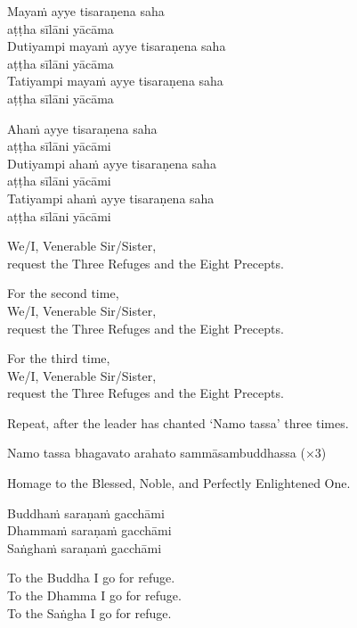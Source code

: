 
Mayaṁ ayye tisaraṇena saha\\\vin aṭṭha sīlāni yācāma\\
Dutiyampi mayaṁ ayye tisaraṇena saha\\\vin aṭṭha sīlāni yācāma\\
Tatiyampi mayaṁ ayye tisaraṇena saha\\\vin aṭṭha sīlāni yācāma


Ahaṁ ayye tisaraṇena saha\\\vin aṭṭha sīlāni yācāmi\\
Dutiyampi ahaṁ ayye tisaraṇena saha\\\vin aṭṭha sīlāni yācāmi\\
Tatiyampi ahaṁ ayye tisaraṇena saha\\\vin aṭṭha sīlāni yācāmi

\begin{english}
  We/I, Venerable Sir/Sister,\\
  request the Three Refuges and the Eight Precepts.

  For the second time,\\
  We/I, Venerable Sir/Sister,\\
  request the Three Refuges and the Eight Precepts.

  For the third time,\\
  We/I, Venerable Sir/Sister,\\
  request the Three Refuges and the Eight Precepts.
\end{english}

\begin{instruction}
  Repeat, after the leader has chanted ‘Namo tassa’ three times.
\end{instruction}

Namo tassa bhagavato arahato sammāsambuddhassa (×3)

\begin{english}
  Homage to the Blessed, Noble, and Perfectly Enlightened One.
\end{english}

\ifhandbookedition
\clearpage
\fi

Buddhaṁ saraṇaṁ gacchāmi\\
Dhammaṁ saraṇaṁ gacchāmi\\
Saṅghaṁ saraṇaṁ gacchāmi

\begin{english}
  To the Buddha I go for refuge.\\
  To the Dhamma I go for refuge.\\
  To the Saṅgha I go for refuge.
\end{english}

